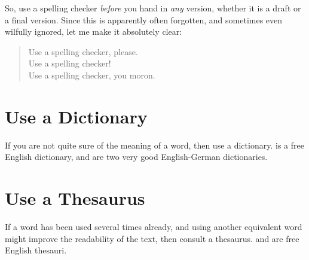 So, use a spelling checker \emph{before} you hand in \emph{any}
version, whether it is a draft or a final version.
Since this is apparently often forgotten, and sometimes even wilfully
ignored, let me make it absolutely clear:
\begin{quote}
\begin{em}
Use a spelling checker, please. \\
Use a spelling checker! \\
Use a spelling checker, you moron. \\
\end{em}
\end{quote}





\section{Use a Dictionary}

If you are not quite sure of the meaning of a word, then use a
dictionary.  \citet{DictionaryCom} is a free English dictionary,
\citet{DictChemnitz} and \citet{DictLeoOrg} are two very good
English-German dictionaries.




\section{Use a Thesaurus}

If a word has been used several times already, and using another
equivalent word might improve the readability of the text, then
consult a thesaurus. \citet{Roget} and \citet{RogetInt} are free
English thesauri.


